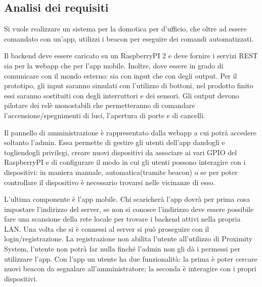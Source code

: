 \subsection{Analisi dei requisiti}
Si vuole realizzare un sistema per la domotica per d'ufficio, che oltre ad essere comandato con un'app, utilizzi i beacon per eseguire dei comandi automatizzati.

Il backend deve essere caricato su un RaspberryPI 2 e deve fornire i servizi REST sia per la webapp che per l'app mobile. 
Inoltre, dove essere in grado di comunicare con il mondo esterno: sia con input che con degli output.
Per il prototipo, gli input saranno simulati con l'utilizzo di bottoni, nel prodotto finito essi saranno sostituiti con degli interruttori e dei sensori.
Gli output devono pilotare dei relè monostabili che permetteranno di comandare l'accensione/spegnimenti di luci, l'apertura di porte e di cancelli.

Il pannello di amministrazione è rappresentato dalla webapp a cui potrà accedere soltanto l'admin. 
Essa permette di gestire gli utenti dell'app dandogli e togliendogli privilegi, creare nuovi dispositivi da associare ai vari GPIO del RaspberryPI e di configurare il modo in cui gli utenti possono interagire con i dispositivi: in maniera manuale, automatica(tramite beacon) o se per poter controllare il dispositivo è necessario trovarsi nelle vicinanze di esso. 

L'ultima componente è l'app mobile. 
Chi scaricherà l'app dovrà per prima cosa impostare l'indirizzo del server, se non si conosce l'indirizzo deve essere possibile fare una scansione della rete locale per trovare i backend attivi nella propria LAN. 
Una volta che si è connessi al server si può proseguire con il login/registrazione. 
La registrazione non abilita l'utente all'utilizzo di Proximity System, l'utente non potrà far nulla finché l'admin non gli dà i permessi per utilizzare l'app. 
Con l'app un utente ha due funzionalità: la prima è poter cercare nuovi beacon da segnalare all'amministratore; la seconda è interagire con i propri dispositivi.

